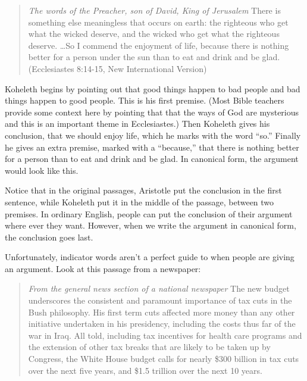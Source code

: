 \begin{quotation}
\noindent \textit{The words of the Preacher, son of David, King of Jerusalem} There is something else meaningless that occurs on earth: the righteous who get what the wicked deserve, and the wicked who get what the righteous deserve. \ldots So I commend the enjoyment of life, because there is nothing better for a person under the sun than to eat and drink and be glad. (Ecclesiastes 8:14-15, New International Version)
\end{quotation}

Koheleth begins by pointing out that good things happen to bad people and bad things happen to good people. This is his first premise. (Most Bible teachers provide some context here by pointing that that the ways of God are mysterious and this is an important theme in Ecclesiastes.) Then Koheleth gives his conclusion, that we should enjoy life, which he marks with the word ``so.'' Finally he gives an extra premise, marked with a ``because,'' that there is nothing better for a person than to eat and drink and be glad. In canonical form, the argument would look like this.


\begin{kormanize}
\end{kormanize}

Notice that in the original passages, Aristotle put the conclusion in the first sentence, while Koheleth put it in the middle of the passage, between two premises. In ordinary English, people can put the conclusion of their argument where ever they want. However, when we write the argument in canonical form, the conclusion goes last.

Unfortunately, indicator words aren't a perfect guide to when people are giving an argument. Look at this passage from a newspaper:

\begin{quotation}
\noindent \textit{From the general news section of a national newspaper} The new budget underscores the consistent and paramount importance of tax cuts in the Bush philosophy. His first term cuts affected more money than any other initiative undertaken in his presidency, including the costs thus far of the war in Iraq. All told, including tax incentives for health care programs and the extension of other tax breaks that are likely to be taken up by Congress, the White House budget calls for nearly \$300 billion in tax cuts over the next five years, and \$1.5 trillion over the next 10 years.  \cite{Toner2006}
\end{quotation}

